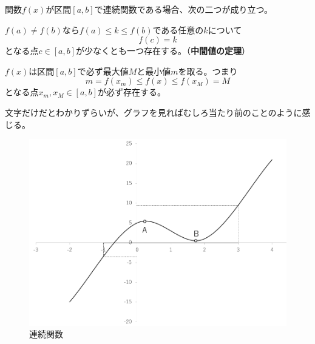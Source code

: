 \documentclass[a4j,dvipdfmx]{jsarticle}
\begin{document}
                関数$f(x)$が区間$[a,b]$で連続関数である場合、次の二つが成り立つ。
                \begin{screen}
                    $f(a)\neq f(b)$なら$f(a)\leq k \leq f(b)$である任意の$k$について
                    \begin{equation*}
                        f(c)=k
                    \end{equation*}
                    となる点$c\in[a,b]$が少なくとも一つ存在する。（\textbf{中間値の定理}）
                \end{screen}
                \begin{screen}
                    $f(x)$は区間$[a,b]$で必ず最大値$M$と最小値$m$を取る。つまり
                    \begin{equation*}
                        m=f(x_m)\leq f(x)\leq f(x_M)=M
                    \end{equation*}
                    となる点$x_m,x_M\in[a,b]$が必ず存在する。
                \end{screen}
                文字だけだとわかりずらいが、グラフを見ればむしろ当たり前のことのように感じる。
                \begin{figure}[h]
                    \centering
                    \includegraphics[keepaspectratio,scale=0.3]{img/QuuNote/ContinuousFuncGraph.png}
                    \caption{連続関数}\label{fig:連続関数,中間値の定理,最大最小}
                \end{figure}
\end{document}
